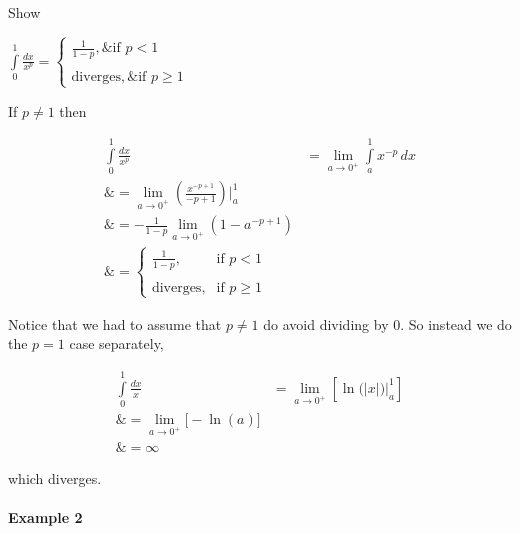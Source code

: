Show

$\int\limits _0^1\frac{dx}{x^p}=\begin{cases}

\frac{1}{1-p},\&\text{if }p < 1 \\\\ \text{diverges}, \& \text{if }p \ge 1

\end{cases}$



If $p\ne1$ then



\begin{align}
\int\limits _0^1\frac{dx}{x^p} 

&= \lim _{a\to 0^+}\int\limits _a^1 x^{-p}\,dx \\\&= \lim _{a\to 0^+}\left(\frac{x^{-p+1}}{-p+1}\right)\Bigg| _a^1 \\\&= -\frac{1}{1-p}\lim _{a\to 0^+}\left(1 - a^{-p+1}\right) \\\&= \begin{cases}

\frac{1}{1-p}, & \text{if } p < 1 \\\\ 

\text{diverges}, & \text{if } p \geq 1 

\end{cases}
\end{align}





Notice that we had to assume that $p\ne1$ do avoid dividing by 0. So instead we do the $p=1$ case separately,



\begin{align}
\int\limits _0^1 \frac{dx}{x} 

&= \lim _{a\to 0^+}\left[\ln\big(|x|\big)\Big| _a^1\right] \\\&= \lim _{a\to 0^+}\Big[-\ln(a)\Big] \\\&= \infty
\end{align}



which diverges.



\paragraph{Example 2}



